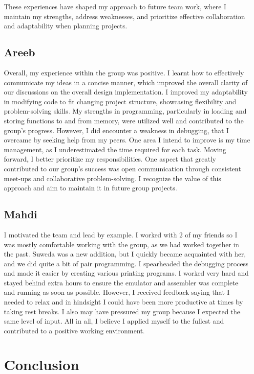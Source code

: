 \documentclass[12pt]{article}
\begin{document}
These experiences have shaped my approach to future team work, where I maintain my strengths, address weaknesses, and prioritize effective collaboration and adaptability when planning projects.

\subsection{Areeb}

Overall, my experience within the group was positive. I learnt how to effectively communicate my ideas in a concise manner, which improved the overall clarity of our discussions on the overall design implementation. I improved my adaptability in modifying code to fit changing project structure, showcasing flexibility and problem-solving skills. My strengths in programming, particularly in loading and storing functions to and from memory, were utilized well and contributed to the group's progress. However, I did encounter a weakness in debugging, that I overcame by seeking help from my peers. One area I intend to improve is my time management, as I underestimated the time required for each task. Moving forward, I better prioritize my responsibilities. One aspect that greatly contributed to our group's success was open communication through consistent meet-ups and collaborative problem-solving. I recognize the value of this approach and aim to maintain it in future group projects.

\subsection{Mahdi}

I motivated the team and lead by example. I worked with 2 of my friends so I was mostly comfortable working with the group, as we had worked together in the past. Suweda was a new addition, but I quickly became acquainted with her, and we did quite a bit of pair programming. I spearheaded the debugging process and made it easier by creating various printing programs. I worked very hard and stayed behind extra hours to ensure the emulator and assembler was complete and running as soon as possible. However, I received feedback saying that I needed to relax and in hindsight I could have been more productive at times by taking rest breaks. I also may have pressured my group because I expected the same level of input. All in all, I believe I applied myself to the fullest and contributed to a positive working environment.

\section{Conclusion}
\end{document}
